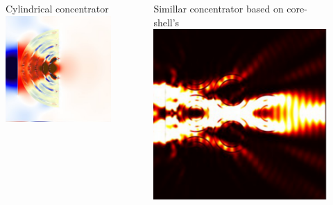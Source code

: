 \documentclass{beamer}
\begin{document}
\begin{frame}
	\begin{columns}
		\begin{column}{0.5\textwidth}
			\begin{figure}[htb]
				Cylindrical concentrator
				\includegraphics[width=\textwidth]{../images/multilayer/konc_polk_poynt.png}\\
			\end{figure}
		\end{column}
		\begin{column}{0.5\textwidth}
				Simillar concentrator based on core-shell's
				\includegraphics[width=\textwidth]{../images/multilayer/konc_coreshell_energy.png}\\
		\end{column}
	\end{columns}
		

\end{frame}
\end{document}
